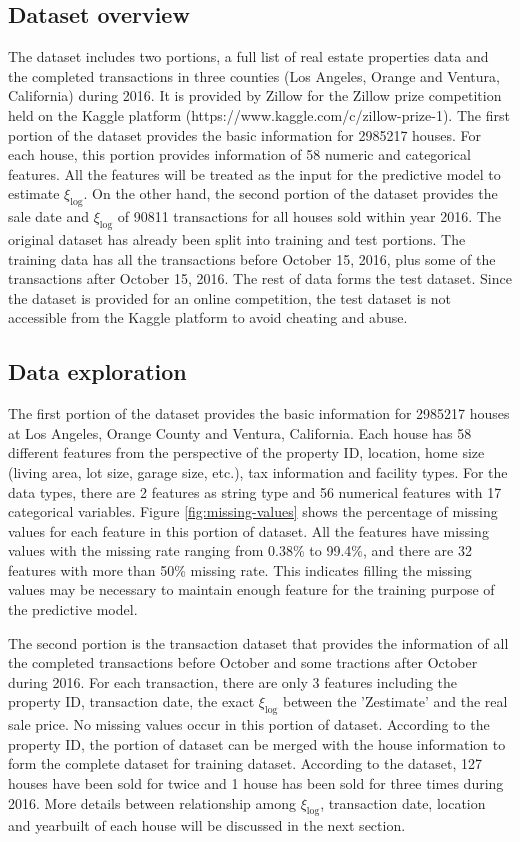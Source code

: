 \documentclass[12pt]{article}
\begin{document}
\subsection{Dataset overview}
The dataset includes two portions, a full list of real estate properties data and the completed transactions in three counties (Los Angeles, Orange and Ventura, California) during 2016. It is provided by Zillow for the Zillow prize competition held on the Kaggle platform (https://www.kaggle.com/c/zillow-prize-1). The first portion of the dataset provides the basic information for 2985217 houses. For each house, this portion provides information of 58 numeric and categorical features. All the features will be treated as the input for the predictive model to estimate $\xi_{\log}$. On the other hand, the second portion of the dataset provides the sale date and $\xi_{\log}$ of 90811 transactions for all houses sold within year 2016. The original dataset has already been split into training and test portions. The training data has all the transactions before October 15, 2016, plus some of the transactions after October 15, 2016. The rest of data forms the test dataset. Since the dataset is provided for an online competition, the test dataset is not accessible from the Kaggle platform to avoid cheating and abuse.

\subsection{Data exploration}
The first portion of the dataset provides the basic information for 2985217 houses at Los Angeles, Orange County and Ventura, California. Each house has 58 different features from the perspective of the property ID, location, home size (living area, lot size, garage size, etc.), tax information and facility types. For the data types, there are 2 features as string type and 56 numerical features with 17 categorical variables. Figure \ref{fig:missing-values} shows the percentage of missing values for each feature in this portion of dataset. All the features have missing values with the missing rate ranging from 0.38\% to 99.4\%, and there are 32 features with more than 50\% missing rate. This indicates filling the missing values may be necessary to maintain enough feature for the training purpose of the predictive model.

The second portion is the transaction dataset that provides the information of all the completed transactions before October and some tractions after October during 2016. For each transaction, there are only 3 features including the property ID, transaction date, the exact $\xi_{\log}$ between the 'Zestimate' and the real sale price. No missing values occur in this portion of dataset. According to the property ID, the portion of dataset can be merged with the house information to form the complete dataset for training dataset. According to the dataset, 127 houses have been sold for twice and 1 house has been sold for three times during 2016. More details between relationship among $\xi_{\log}$, transaction date, location and yearbuilt of each house will be discussed in the next section.
\end{document}

